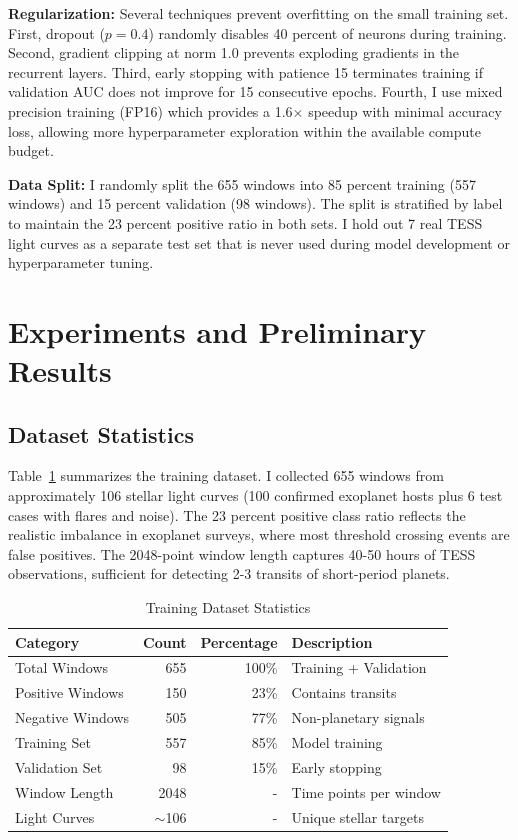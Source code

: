 \documentclass[letterpaper]{article}
\begin{document}
\textbf{Regularization:} Several techniques prevent overfitting on the small training set. First, dropout ($p=0.4$) randomly disables 40 percent of neurons during training. Second, gradient clipping at norm 1.0 prevents exploding gradients in the recurrent layers. Third, early stopping with patience 15 terminates training if validation AUC does not improve for 15 consecutive epochs. Fourth, I use mixed precision training (FP16) which provides a 1.6$\times$ speedup with minimal accuracy loss, allowing more hyperparameter exploration within the available compute budget.

\textbf{Data Split:} I randomly split the 655 windows into 85 percent training (557 windows) and 15 percent validation (98 windows). The split is stratified by label to maintain the 23 percent positive ratio in both sets. I hold out 7 real TESS light curves as a separate test set that is never used during model development or hyperparameter tuning.

\section{Experiments and Preliminary Results}

\subsection{Dataset Statistics}

Table~\ref{tab:dataset} summarizes the training dataset. I collected 655 windows from approximately 106 stellar light curves (100 confirmed exoplanet hosts plus 6 test cases with flares and noise). The 23 percent positive class ratio reflects the realistic imbalance in exoplanet surveys, where most threshold crossing events are false positives. The 2048-point window length captures 40-50 hours of TESS observations, sufficient for detecting 2-3 transits of short-period planets.

\begin{table}[h]
\centering
\caption{Training Dataset Statistics}
\label{tab:dataset}
\begin{tabular}{@{}lrrl@{}}
\toprule
\textbf{Category} & \textbf{Count} & \textbf{Percentage} & \textbf{Description} \\
\midrule
Total Windows & 655 & 100\% & Training + Validation \\
Positive Windows & 150 & 23\% & Contains transits \\
Negative Windows & 505 & 77\% & Non-planetary signals \\
Training Set & 557 & 85\% & Model training \\
Validation Set & 98 & 15\% & Early stopping \\
Window Length & 2048 & - & Time points per window \\
Light Curves & $\sim$106 & - & Unique stellar targets \\
\bottomrule
\end{tabular}
\end{table}
\end{document}
